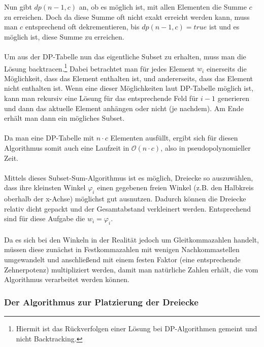 \documentclass[a4paper, notitlepage, 12pt]{scrartcl}
\begin{document}
  Nun gibt $dp(n-1,c)$ an, ob es möglich ist, mit allen Elementen die Summe $c$ zu erreichen. Doch da diese Summe oft nicht exakt erreicht werden kann, muss man $c$ entsprechend oft dekrementieren, bis $dp(n-1,c) = true$ ist und es möglich ist, diese Summe zu erreichen. \\ \\
  Um aus der DP-Tabelle nun das eigentliche Subset zu erhalten, muss man die Lösung backtracen.\footnote{Hiermit ist das Rückverfolgen einer Lösung bei DP-Algorithmen gemeint und nicht Backtracking.}\cite{Src:dpbacktrace} Dabei betrachtet man für jedes Element $w_i$ einerseits die Möglichkeit, dass das Element enthalten ist, und andererseits, dass das Element nicht enthalten ist. Wenn eine dieser Möglichkeiten laut DP-Tabelle möglich ist, kann man rekursiv eine Lösung für das entsprechende Feld für $i-1$ generieren und dann das aktuelle Element anhängen oder nicht (je nachdem). Am Ende erhält man dann ein mögliches Subset.
  \\ \\
  Da man eine DP-Tabelle mit $n \cdot c$ Elementen ausfüllt, ergibt sich für diesen Algorithmus somit auch eine Laufzeit in $\mathcal{O}(n \cdot c)$, also in pseudopolynomieller Zeit.
  \\ \\
  Mittels dieses Subset-Sum-Algorithmus ist es möglich, Dreiecke so auszuwählen, dass ihre kleinsten Winkel $\varphi_i$ einen gegebenen freien Winkel (z.B. den Halbkreis oberhalb der x-Achse) möglichst gut ausnutzen. Dadurch können die Dreiecke relativ dicht gepackt und der Gesamtabstand verkleinert werden. Entsprechend sind für diese Aufgabe die $w_i = \varphi_i$. \\ \\
   Da es sich bei den Winkeln in der Realität jedoch um Gleitkommazahlen handelt, müssen diese zunächst in Festkommazahlen mit wenigen Nachkommastellen umgewandelt und anschließend mit einem festen Faktor (eine entsprechende Zehnerpotenz) multipliziert werden, damit man natürliche Zahlen erhält, die vom Algorithmus verarbeitet werden können.
  \subsubsection{Der Algorithmus zur Platzierung der Dreiecke}
\end{document}

